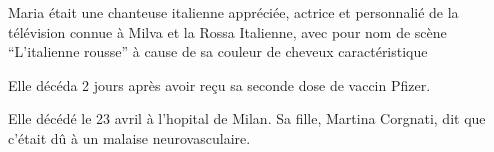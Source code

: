 Maria était une chanteuse italienne appréciée, actrice et personnalié de la
télévision connue à Milva et la Rossa Italienne, avec pour nom de scène
“L'italienne rousse” à cause de sa couleur de cheveux caractéristique

Elle décéda 2 jours après avoir reçu sa seconde dose de vaccin Pfizer.

Elle décédé le 23 avril à l'hopital de Milan. Sa fille, Martina Corgnati, dit
que c'était dû à un malaise neurovasculaire.

